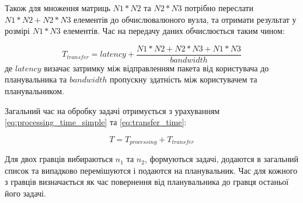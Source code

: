 Також для множення матриць $N1*N2$ та $N2*N3$ потрібно переслати $N1*N2 + N2*N3$ елементів до обчислювалюного вузла, та отримати результат у розмірі $N1*N3$ елементів. Час на передачу даних обчислюється таким чином:

\begin{equation}
\label{eq:transfer_time}
T_{transfer} = latency + \frac{N1*N2+N2*N3+N1*N3}{bandwidth}
\end{equation}
де $latency$ визачає затримку між відправленням пакета від користувача до планувальника та $bandwidth$ пропускну здатність між користувачем та планувальником.

Загальний час на обробку задачі отримується з урахуванням \ref{eq:processing_time_simple} та \ref{eq:transfer_time}:

\begin{equation}
\label{eq:total_task_processing_time}
T = T_{processing} + T_{transfer}
\end{equation}

Для двох гравців вибираються $n_1$ та $n_2$, формуються задачі, додаются в загальний список та випадково перемішуются і подаются на планувальник. Час для кожного з гравців визначається як час повернення від планувальника до гравця останьої його задачі.